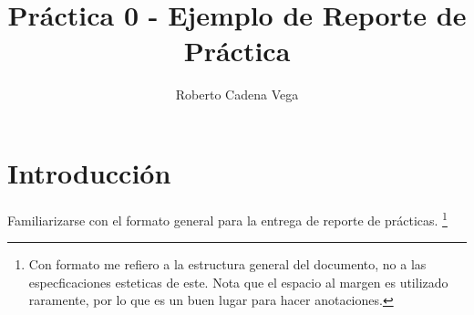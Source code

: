 



\title{Práctica 0 - Ejemplo de Reporte de Práctica}
\author{Roberto Cadena Vega} %
\date{}




\maketitle %


\section{Introducción}

	Familiarizarse con el formato general para la entrega de reporte de prácticas. \footnote{Con formato me refiero a la estructura general del documento, no a las especficaciones esteticas de este. Nota que el espacio al margen es utilizado raramente, por lo que es un buen lugar para hacer anotaciones.}


